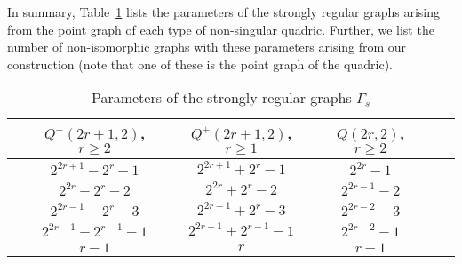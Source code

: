 \documentclass[12pt]{article}
\begin{document}
In summary, Table~\ref{table-summary} lists the parameters of the strongly regular graphs arising from the point graph of each type of non-singular quadric. Further, we list the number of non-isomorphic graphs with these parameters arising from our construction (note that one of these is the point graph of the quadric). 
%
%


\begin{table}[h]\caption{Parameters of the strongly regular graphs $\Gamma_s$}\label{table-summary}
\begin{center}\begin{tabular}{|p{3.1 cm}|c|c|c|c|p{1.8cm}|}
\hline
\centering{quadric} &$Q^-(2r+1,2)$, $r\geq 2$ &  $Q^+(2r+1,2)$, $r\geq 1$ &  $Q(2r,2)$, $r\geq 2$\\
\hline
\centering{$v$} &$2^{2r+1}-2^r-1$&$2^{2r+1}+2^r-1$&$2^{2r}-1$     \\
\centering{$k$}&$2^{2r}-2^r-2$&$2^{2r}+2^r-2$&$2^{2r-1}-2$\\
\centering{$\lambda$}&$2^{2r-1}-2^{r}-3$&$2^{2r-1}+2^{r}-3$&$2^{2r-2}-3$\\
\centering{$\mu$}&$2^{2r-1}-2^{r-1}-1$&$2^{2r-1}+2^{r-1}-1$&$2^{2r-2}-1$\\
\hline
\centering{\small \# non-isomorphic  graphs}
&$r-1$&$r$&$r-1$\\ 
\hline
\end{tabular}\end{center}

\end{table}%
\end{document}
